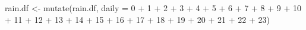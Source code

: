 \documentclass[
]{article}
\newenvironment{Shaded}{\begin{snugshade}}{\end{snugshade}}
\newcommand{\AttributeTok}[1]{\textcolor[rgb]{0.77,0.63,0.00}{#1}}
\newcommand{\FunctionTok}[1]{\textcolor[rgb]{0.00,0.00,0.00}{#1}}
\newcommand{\NormalTok}[1]{#1}
\newcommand{\OtherTok}[1]{\textcolor[rgb]{0.56,0.35,0.01}{#1}}
\newcommand{\SpecialCharTok}[1]{\textcolor[rgb]{0.00,0.00,0.00}{#1}}
\newcommand{\StringTok}[1]{\textcolor[rgb]{0.31,0.60,0.02}{#1}}
\begin{document}
\begin{Shaded}
\begin{Highlighting}[]
\NormalTok{rain.df }\OtherTok{\textless{}{-}} \FunctionTok{mutate}\NormalTok{(rain.df, }\AttributeTok{daily =} \StringTok{\textasciigrave{}}\AttributeTok{0}\StringTok{\textasciigrave{}} \SpecialCharTok{+} \StringTok{\textasciigrave{}}\AttributeTok{1}\StringTok{\textasciigrave{}} \SpecialCharTok{+} \StringTok{\textasciigrave{}}\AttributeTok{2}\StringTok{\textasciigrave{}} \SpecialCharTok{+} \StringTok{\textasciigrave{}}\AttributeTok{3}\StringTok{\textasciigrave{}} \SpecialCharTok{+} \StringTok{\textasciigrave{}}\AttributeTok{4}\StringTok{\textasciigrave{}} \SpecialCharTok{+}
    \StringTok{\textasciigrave{}}\AttributeTok{5}\StringTok{\textasciigrave{}} \SpecialCharTok{+} \StringTok{\textasciigrave{}}\AttributeTok{6}\StringTok{\textasciigrave{}} \SpecialCharTok{+} \StringTok{\textasciigrave{}}\AttributeTok{7}\StringTok{\textasciigrave{}} \SpecialCharTok{+} \StringTok{\textasciigrave{}}\AttributeTok{8}\StringTok{\textasciigrave{}} \SpecialCharTok{+} \StringTok{\textasciigrave{}}\AttributeTok{9}\StringTok{\textasciigrave{}} \SpecialCharTok{+} \StringTok{\textasciigrave{}}\AttributeTok{10}\StringTok{\textasciigrave{}} \SpecialCharTok{+} \StringTok{\textasciigrave{}}\AttributeTok{11}\StringTok{\textasciigrave{}} \SpecialCharTok{+} \StringTok{\textasciigrave{}}\AttributeTok{12}\StringTok{\textasciigrave{}} \SpecialCharTok{+} \StringTok{\textasciigrave{}}\AttributeTok{13}\StringTok{\textasciigrave{}} \SpecialCharTok{+}
    \StringTok{\textasciigrave{}}\AttributeTok{14}\StringTok{\textasciigrave{}} \SpecialCharTok{+} \StringTok{\textasciigrave{}}\AttributeTok{15}\StringTok{\textasciigrave{}} \SpecialCharTok{+} \StringTok{\textasciigrave{}}\AttributeTok{16}\StringTok{\textasciigrave{}} \SpecialCharTok{+} \StringTok{\textasciigrave{}}\AttributeTok{17}\StringTok{\textasciigrave{}} \SpecialCharTok{+} \StringTok{\textasciigrave{}}\AttributeTok{18}\StringTok{\textasciigrave{}} \SpecialCharTok{+} \StringTok{\textasciigrave{}}\AttributeTok{19}\StringTok{\textasciigrave{}} \SpecialCharTok{+} \StringTok{\textasciigrave{}}\AttributeTok{20}\StringTok{\textasciigrave{}} \SpecialCharTok{+} \StringTok{\textasciigrave{}}\AttributeTok{21}\StringTok{\textasciigrave{}} \SpecialCharTok{+} \StringTok{\textasciigrave{}}\AttributeTok{22}\StringTok{\textasciigrave{}} \SpecialCharTok{+}
    \StringTok{\textasciigrave{}}\AttributeTok{23}\StringTok{\textasciigrave{}}\NormalTok{)}
\end{Highlighting}
\end{Shaded}
\end{document}
